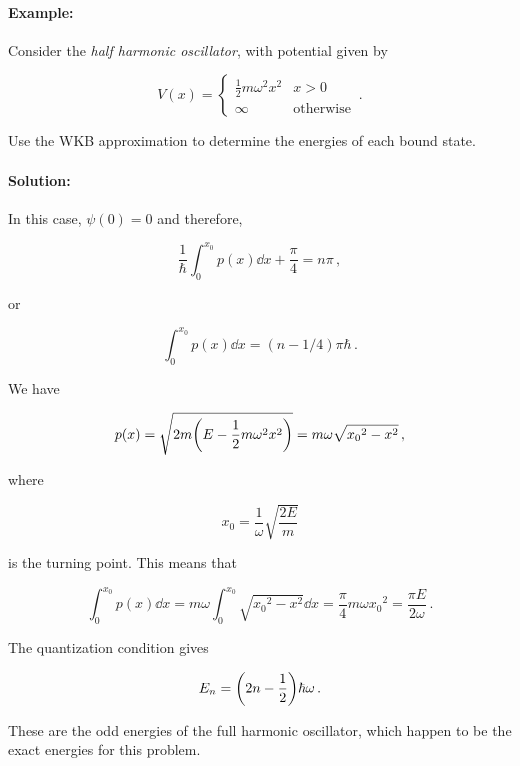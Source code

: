 \documentclass[12pt, titlepage]{article}
\begin{document}
\begin{mdframed}[backgroundcolor=gray!20]
\paragraph*{Example:}
Consider the \textit{half harmonic oscillator}, with potential given by

\begin{equation*}
	V(x) = \begin{cases}
	\frac{1}{2}m\omega^2 x^2 & x>0 \\[4pt]
	\infty &\text{otherwise}
	\end{cases} \,.
\end{equation*}

Use the WKB approximation to determine the energies of each bound state.

\paragraph*{Solution:}
In this case, $\psi(0) = 0$ and therefore,

\begin{equation*}
	\frac{1}{\hbar}\int_{0}^{x_0}p(x)\dd{x} + \frac{\pi}{4} = n\pi \,,
\end{equation*}

or

\begin{equation*}
	\int_{0}^{x_0}p(x)\dd{x} = (n-1/4)\pi\hbar \,.
\end{equation*}

We have

\begin{equation*}
	p(x) = \sqrt{2m\qty(E - \frac{1}{2}m\omega^2 x^2)} = m\omega\sqrt{{x_0}^2 - x^2} \,,
\end{equation*}

where 

\begin{equation*}
	x_0 = \frac{1}{\omega}\sqrt{\frac{2E}{m}}
\end{equation*}

is the turning point. This means that

\begin{equation*}
	\int_{0}^{x_0}p(x)\dd{x} = m\omega\int_{0}^{x_0}\sqrt{{x_0}^2 - x^2}\dd{x} = \frac{\pi}{4}m\omega{x_0}^2 = \frac{\pi E}{2\omega}\,.
\end{equation*}

The quantization condition gives

\begin{equation*}
	E_n = \qty(2n-\frac{1}{2})\hbar\omega \,.
\end{equation*}

These are the odd energies of the full harmonic oscillator, which happen to be the exact energies for this problem.
\end{mdframed}
\end{document}
